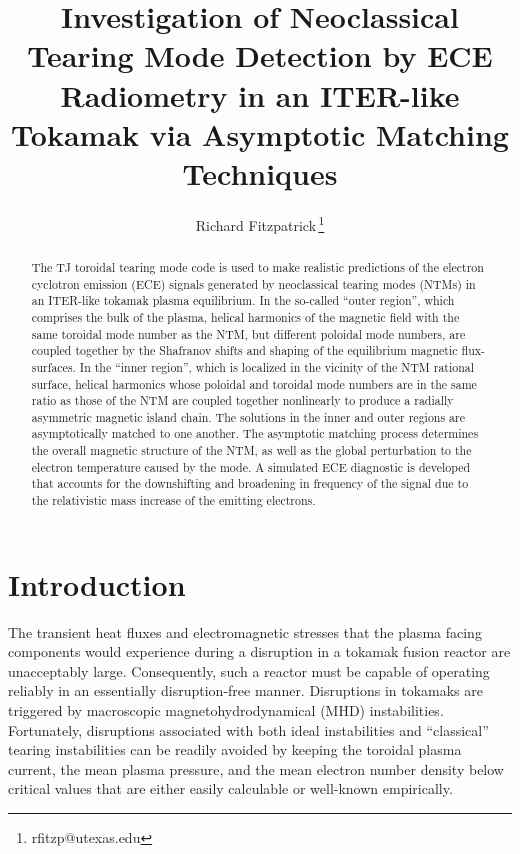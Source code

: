 \documentclass[12pt,prb,aps]{revtex4-1}
\begin{document}
\title{Investigation of Neoclassical Tearing Mode Detection by ECE Radiometry in  an ITER-like Tokamak via Asymptotic Matching Techniques}
\author{Richard Fitzpatrick\,\footnote{rfitzp@utexas.edu}}

\begin{abstract}
The TJ toroidal tearing mode code is used to make realistic predictions of  the electron cyclotron emission (ECE) signals generated by  neoclassical
tearing modes (NTMs) in an ITER-like tokamak plasma equilibrium. In the so-called ``outer region'', which comprises the bulk of the plasma, helical
harmonics of the magnetic field with the same toroidal mode number as the NTM, but different poloidal mode numbers, are coupled together by the Shafranov shifts and
shaping of the equilibrium magnetic flux-surfaces. In the ``inner region'', which is localized in the vicinity of the NTM rational surface, helical harmonics whose
poloidal and toroidal mode numbers are in the same ratio as those of the NTM are coupled together nonlinearly to produce a radially asymmetric magnetic
island chain. The solutions in the inner and outer regions are asymptotically matched to one another. The asymptotic matching process determines the
overall magnetic structure of the NTM, as well as the global  perturbation to the electron temperature caused by the mode. A simulated ECE diagnostic is developed that accounts for the
 downshifting and broadening in frequency of the signal due to the relativistic mass increase of the emitting electrons. 

\end{abstract}
\maketitle

\section{Introduction}
The transient heat fluxes and electromagnetic stresses that the plasma facing components would experience during a disruption in
a tokamak fusion reactor are unacceptably large.\cite{iter,wesson}  Consequently, such a reactor must be capable of  operating reliably in an essentially disruption-free manner. 
Disruptions in tokamaks are triggered by macroscopic magnetohydrodynamical (MHD) instabilities.\cite{jet} Fortunately, disruptions associated with both ideal instabilities   and
``classical'' tearing instabilities can   be readily avoided  by keeping the toroidal plasma current, the  mean plasma pressure, and
the mean electron number density below  critical values that are either easily calculable or well-known empirically.\cite{iter}  
\end{document}
